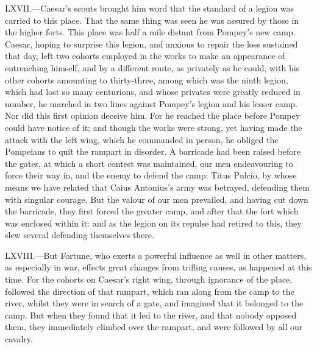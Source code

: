 LXVII.—Caesar's scouts brought him word that the standard of a legion
was carried to this place. That the same thing was seen he was assured
by those in the higher forts. This place was half a mile distant from
Pompey's new camp. Caesar, hoping to surprise this legion, and anxious
to repair the loss sustained that day, left two cohorts employed in the
works to make an appearance of entrenching himself, and by a different
route, as privately as he could, with his other cohorts amounting to
thirty-three, among which was the ninth legion, which had lost so many
centurions, and whose privates were greatly reduced in number, he
marched in two lines against Pompey's legion and his lesser camp. Nor
did this first opinion deceive him. For he reached the place before
Pompey could have notice of it; and though the works were strong, yet
having made the attack with the left wing, which he commanded in person,
he obliged the Pompeians to quit the rampart in disorder. A barricade
had been raised before the gates, at which a short contest was
maintained, our men endeavouring to force their way in, and the enemy to
defend the camp; Titus Pulcio, by whose means we have related that Caius
Antonius's army was betrayed, defending them with singular courage. But
the valour of our men prevailed, and having cut down the barricade, they
first forced the greater camp, and after that the fort which was
enclosed within it: and as the legion on its repulse had retired to
this, they slew several defending themselves there.

LXVIII.—But Fortune, who exerts a powerful influence as well in other
matters, as especially in war, effects great changes from trifling
causes, as happened at this time. For the cohorts on Caesar's right
wing, through ignorance of the place, followed the direction of that
rampart, which ran along from the camp to the river, whilst they were in
search of a gate, and imagined that it belonged to the camp. But when
they found that it led to the river, and that nobody opposed them, they
immediately climbed over the rampart, and were followed by all our
cavalry.

